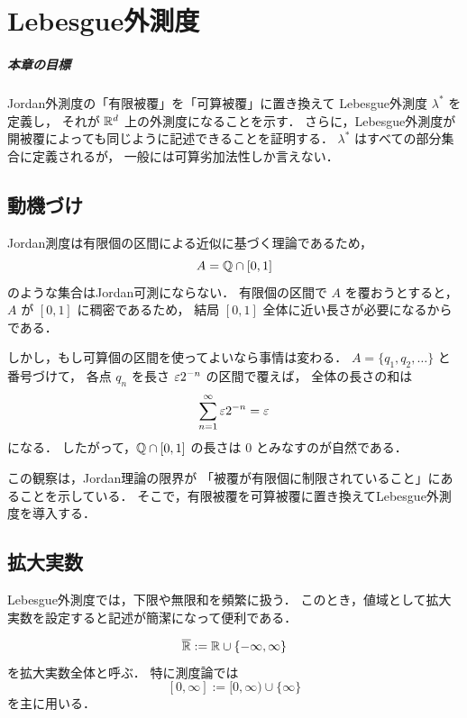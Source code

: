 \setcounter{chapter}{2}
\chapter{Lebesgue外測度}

\paragraph{本章の目標}
Jordan外測度の「有限被覆」を「可算被覆」に置き換えて
Lebesgue外測度 $\lambda^*$ を定義し，
それが $\mathbb R^d$ 上の外測度になることを示す．
さらに，Lebesgue外測度が開被覆によっても同じように記述できることを証明する．
$\lambda^*$ はすべての部分集合に定義されるが，
一般には可算劣加法性しか言えない．

\section{動機づけ}

Jordan測度は有限個の区間による近似に基づく理論であるため，
\[
A = \mathbb Q \cap [0,1]
\]
のような集合はJordan可測にならない．
有限個の区間で $A$ を覆おうとすると，
$A$ が $[0,1]$ に稠密であるため，
結局 $[0,1]$ 全体に近い長さが必要になるからである．

しかし，もし可算個の区間を使ってよいなら事情は変わる．
$A=\{q_1,q_2,\dots\}$ と番号づけて，
各点 $q_n$ を長さ $\varepsilon 2^{-n}$ の区間で覆えば，
全体の長さの和は
\[
\sum_{n=1}^{\infty} \varepsilon 2^{-n} = \varepsilon
\]
になる．
したがって，$\mathbb Q \cap [0,1]$ の長さは $0$ とみなすのが自然である．

この観察は，Jordan理論の限界が
「被覆が有限個に制限されていること」にあることを示している．
そこで，有限被覆を可算被覆に置き換えてLebesgue外測度を導入する．

\section{拡大実数}

Lebesgue外測度では，下限や無限和を頻繁に扱う．
このとき，値域として拡大実数を設定すると記述が簡潔になって便利である．

\begin{definition}[拡大実数]
\[
\overline{\mathbb R} := \mathbb R \cup \{-\infty,\infty\}
\]
を拡大実数全体と呼ぶ．
特に測度論では
\[
[0,\infty]:=[0,\infty)\cup\{\infty\}
\]
を主に用いる．
\end{definition}


